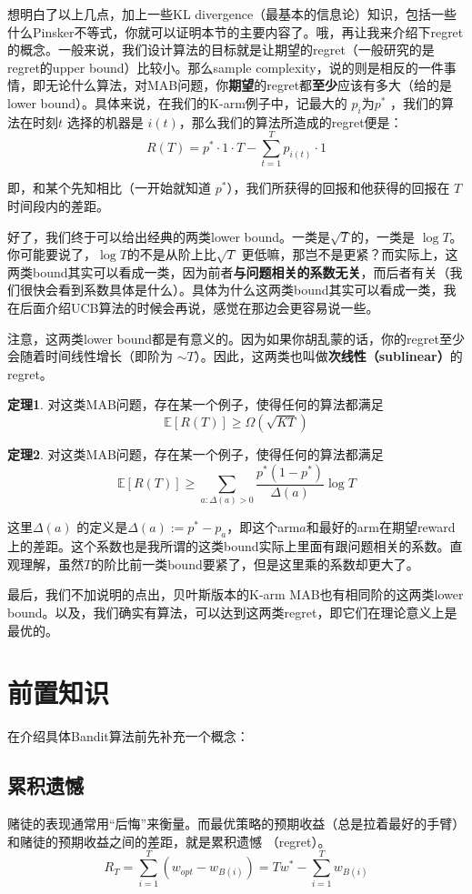\documentclass[12pt]{article}
\begin{document}
想明白了以上几点，加上一些KL divergence（最基本的信息论）知识，包括一些什么Pinsker不等式，你就可以证明本节的主要内容了。哦，再让我来介绍下regret的概念。一般来说，我们设计算法的目标就是让期望的regret（一般研究的是regret的upper bound）比较小。那么sample complexity，说的则是相反的一件事情，即无论什么算法，对MAB问题，你\textbf{期望}的regret都\textbf{至少}应该有多大（给的是lower bound）。具体来说，在我们的K-arm例子中，记最大的 $p_i$为$p^*$ ，我们的算法在时刻$t$ 选择的机器是 $i(t)$，那么我们的算法所造成的regret便是：
$$
R(T) = p^* \cdot 1 \cdot T - \sum_{t=1}^Tp_{i(t)} \cdot 1
$$

即，和某个先知相比（一开始就知道 $p^*$），我们所获得的回报和他获得的回报在 $T$ 时间段内的差距。

好了，我们终于可以给出经典的两类lower bound。一类是$\sqrt{T}$的，一类是 $\log{T}$。你可能要说了，$\log{T}$的不是从阶上比$\sqrt{T}$ 更低嘛，那岂不是更紧？而实际上，这两类bound其实可以看成一类，因为前者\textbf{与问题相关的系数无关}，而后者有关（我们很快会看到系数具体是什么）。具体为什么这两类bound其实可以看成一类，我在后面介绍UCB算法的时候会再说，感觉在那边会更容易说一些。

注意，这两类lower bound都是有意义的。因为如果你胡乱蒙的话，你的regret至少会随着时间线性增长（即阶为 $\sim T$）。因此，这两类也叫做\textbf{次线性（sublinear）}的regret。

\textbf{定理1}. 对这类MAB问题，存在某一个例子，使得任何的算法都满足
$$
\mathbb{E}[R(T)] \ge \Omega(\sqrt{KT})
$$ 

\textbf{定理2}. 对这类MAB问题，存在某一个例子，使得任何的算法都满足
$$
\mathbb{E}[R(T)] \ge \sum_{a:\Delta(a) > 0} \frac{p^*(1-p^*)}{\Delta(a)}\log{T}
$$

这里$\Delta(a)$ 的定义是$\Delta(a) := p^* - p_a$，即这个arm$a$和最好的arm在期望reward上的差距。这个系数也是我所谓的这类bound实际上里面有跟问题相关的系数。直观理解，虽然$T$的阶比前一类bound要紧了，但是这里乘的系数却更大了。

最后，我们不加说明的点出，贝叶斯版本的K-arm MAB也有相同阶的这两类lower bound。以及，我们确实有算法，可以达到这两类regret，即它们在理论意义上是最优的。


\section{前置知识}
在介绍具体Bandit算法前先补充一个概念：

\subsection{累积遗憾}
赌徒的表现通常用“后悔”来衡量。而最优策略的预期收益（总是拉着最好的手臂）和赌徒的预期收益之间的差距，就是累积遗憾
（regret）。
$$
R_T = \sum_{i=1}^T(w_{opt} - w_{B(i)}) = Tw^* - \sum_{i=1}^Tw_{B(i)}
$$
\end{document}
